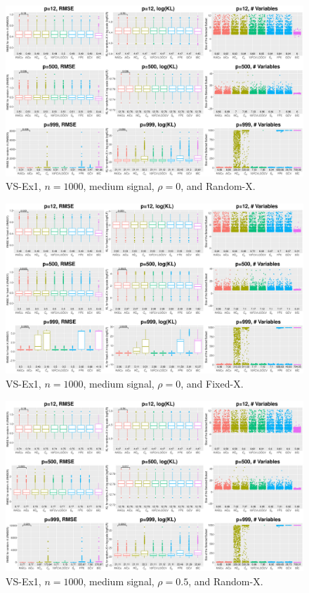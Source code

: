\clearpage
\begin{figure}[!ht]
\centering
\includegraphics[width=\textwidth]{figures/supplement/randomx_VS-Ex1_n1000_msnr_rho0.eps}
\caption{VS-Ex1, $n=1000$, medium signal, $\rho=0$, and Random-X.}
\end{figure}
\begin{figure}[!ht]
\centering
\includegraphics[width=\textwidth]{figures/supplement/fixedx_VS-Ex1_n1000_msnr_rho0.eps}
\caption{VS-Ex1, $n=1000$, medium signal, $\rho=0$, and Fixed-X.}
\end{figure}
\clearpage
\begin{figure}[!ht]
\centering
\includegraphics[width=\textwidth]{figures/supplement/randomx_VS-Ex1_n1000_msnr_rho05.eps}
\caption{VS-Ex1, $n=1000$, medium signal, $\rho=0.5$, and Random-X.}
\end{figure}
